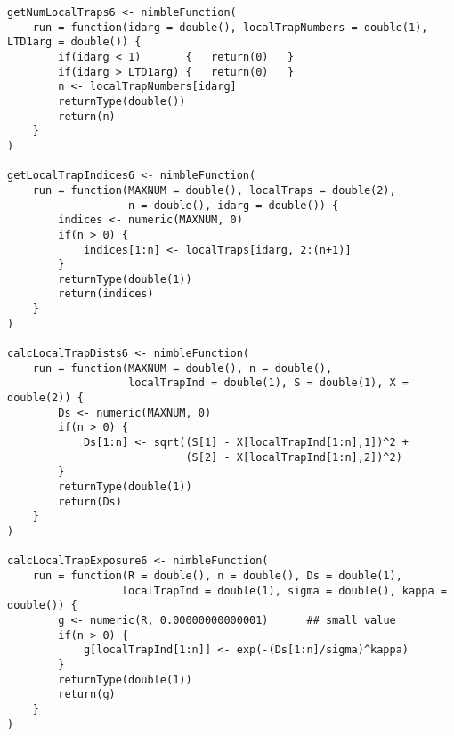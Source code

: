 \begin{singlespace}
\begin{small}
\begin{verbatim}
getNumLocalTraps6 <- nimbleFunction(
    run = function(idarg = double(), localTrapNumbers = double(1), LTD1arg = double()) {
        if(idarg < 1)       {   return(0)   }
        if(idarg > LTD1arg) {   return(0)   }
        n <- localTrapNumbers[idarg]
        returnType(double())
        return(n)
    }
)

getLocalTrapIndices6 <- nimbleFunction(
    run = function(MAXNUM = double(), localTraps = double(2),
                   n = double(), idarg = double()) {
        indices <- numeric(MAXNUM, 0)
        if(n > 0) {
            indices[1:n] <- localTraps[idarg, 2:(n+1)]
        }
        returnType(double(1))
        return(indices)
    }
)

calcLocalTrapDists6 <- nimbleFunction(
    run = function(MAXNUM = double(), n = double(), 
                   localTrapInd = double(1), S = double(1), X = double(2)) {
        Ds <- numeric(MAXNUM, 0)
        if(n > 0) {
            Ds[1:n] <- sqrt((S[1] - X[localTrapInd[1:n],1])^2 + 
                            (S[2] - X[localTrapInd[1:n],2])^2)
        }
        returnType(double(1))
        return(Ds)
    }
)

calcLocalTrapExposure6 <- nimbleFunction(
    run = function(R = double(), n = double(), Ds = double(1),
                  localTrapInd = double(1), sigma = double(), kappa = double()) {
        g <- numeric(R, 0.00000000000001)      ## small value
        if(n > 0) {
            g[localTrapInd[1:n]] <- exp(-(Ds[1:n]/sigma)^kappa)
        }
        returnType(double(1))
        return(g)
    }
)


\end{verbatim}
\end{small}
\end{singlespace}
